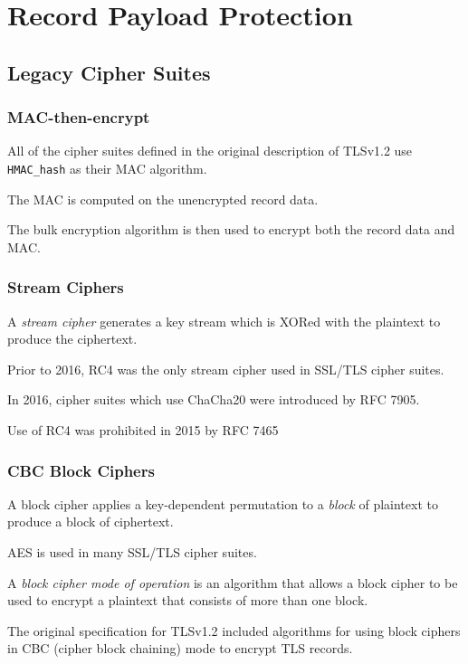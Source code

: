 \documentclass[aspectratio=169]{beamer}
\begin{document}
\section{Record Payload Protection}
\begin{frame}[Triangle=siiorange]
	\tocpage
\end{frame}

\subsection{Legacy Cipher Suites}
\begin{frame}[triangle=siiblue]
	\frametitle{MAC-then-encrypt}
	All of the cipher suites defined in the original description of TLSv1.2 use \texttt{HMAC\_hash} as their MAC algorithm.

	\vfill
	
	The MAC is computed on the unencrypted record data.
	
	\vfill
	
	The bulk encryption algorithm is then used to encrypt both the record data and MAC.
\end{frame}

\begin{frame}[triangle=siiblue]
	\frametitle{Stream Ciphers}
	A \emph{stream cipher} generates a key stream which is XORed with the plaintext to produce the ciphertext.
	
	\vfill
	
	Prior to 2016, RC4 was the only stream cipher used in SSL/TLS cipher suites.
	
	\vfill
	
	In 2016, cipher suites which use ChaCha20 were introduced by RFC 7905.
	
	\vfill
	
	Use of RC4 was prohibited in 2015 by RFC 7465
\end{frame}

\begin{frame}[triangle=siiblue]
	\frametitle{CBC Block Ciphers}
	A block cipher applies a key-dependent permutation to a \emph{block} of plaintext to produce a block of ciphertext.
	
	\vfill
	
	AES is used in many SSL/TLS cipher suites.
	
	\vfill
	
	A \emph{block cipher mode of operation} is an algorithm that allows a block cipher to be used to encrypt a plaintext that consists of more than one block. 
	
	\vfill 
	
	The original specification for TLSv1.2 included algorithms for using block ciphers in CBC (cipher block chaining) mode to encrypt TLS records.
\end{frame}
\end{document}
